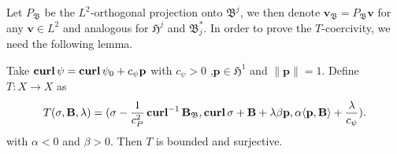 \documentclass[../master_thesis.tex]{subfiles}
\begin{document}
Let $P_\mathfrak{B}$ be the $L^2$-orthogonal projection onto $\mathfrak{B}^j$, 
we then denote $\mathbf{v}_\mathfrak{B} = P_\mathfrak{B} \mathbf{v}$ for any $\mathbf{v} \in L^2$ 
and analogous for 
$\mathfrak{H}^j$ and $\mathfrak{B}^*_j$.
In order to prove the $T$-coercivity, we need the following lemma.
\begin{lemma}\label{lem:T_for_T_coercivity_surjective}
    Take $\veccurl \psi = \veccurl \psi_0 + c_\psi \mathbf{p}$ with $c_\psi > 0$
    ,$\mathbf{p} \in \mathfrak{H}^1$ and $\lVert \mathbf{p}\rVert =1$.
    Define $T:X \rightarrow X$ as 
    \begin{align*}
        T(\sigma, \mathbf{B},\lambda)
        = (\sigma - \frac{1}{c_P^2}\veccurl^{-1}\mathbf{B}_\mathfrak{B}, \veccurl \sigma + \mathbf{B} + \lambda \beta \mathbf{p},
            \alpha \langle \mathbf{p}, \mathbf{B} \rangle  
            + \frac{\lambda}{c_\psi}).
    \end{align*}
    with $\alpha < 0$ and $\beta>0$.
    Then $T$ is bounded and surjective. 
\end{lemma}
\end{document}
